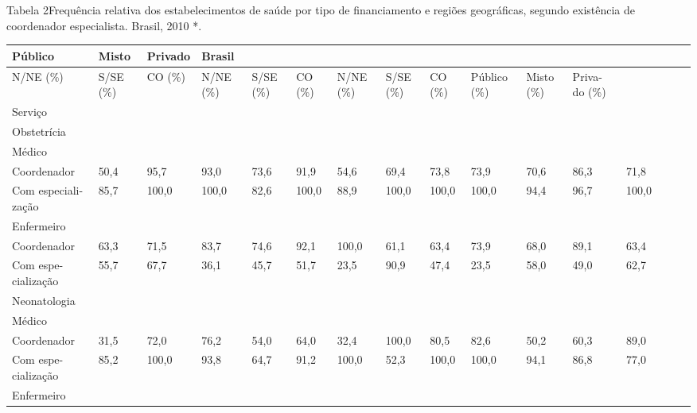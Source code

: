 \documentclass{article}
\begin{document}
Tabela 2Frequência relativa dos estabelecimentos de saúde por tipo de
financiamento e regiões geográficas, segundo existência de coordenador
especialista. Brasil, 2010 *.
\begin{table}
\begin{xtabular}{ l | l | l | l l | l | l | l | l | l | l | l | l | l | l | l }
\hline
Público & Misto & Privado & Brasil\\ \hline
N/NE (\%) & S/SE (\%) & CO (\%) & N/NE (\%) & S/SE (\%) & CO (\%) & N/NE (\%) &
S/SE (\%) & CO (\%) & Público (\%) & Misto (\%) & Priva- do (\%)\\ \hline
Serviço
&
&
&
&
&
&
&
&
&
&
&
&
\\ \hline

Obstetrícia
&
&
&
&
&
&
&
&
&
&
&
&
\\ \hline

Médico
&
&
&
&
&
&
&
&
&
&
&
&
\\ \hline

Coordenador
& 50,4
& 95,7
& 93,0
& 73,6
& 91,9
& 54,6
& 69,4
& 73,8
& 73,9
& 70,6
& 86,3
& 71,8
\\ \hline

Com especiali-zação
& 85,7
& 100,0
& 100,0
& 82,6
& 100,0
& 88,9
& 100,0
& 100,0
& 100,0
& 94,4
& 96,7
& 100,0
\\ \hline

Enfermeiro
&
&
&
&
&
&
&
&
&
&
&
&
\\ \hline

Coordenador
& 63,3
& 71,5
& 83,7
& 74,6
& 92,1
& 100,0
& 61,1
& 63,4
& 73,9
& 68,0
& 89,1
& 63,4
\\ \hline

Com espe-cialização
& 55,7
& 67,7
& 36,1
& 45,7
& 51,7
& 23,5
& 90,9
& 47,4
& 23,5
& 58,0
& 49,0
& 62,7
\\ \hline

Neonatologia
&
&
&
&
&
&
&
&
&
&
&
&
\\ \hline

Médico
&
&
&
&
&
&
&
&
&
&
&
&
\\ \hline

Coordenador
& 31,5
& 72,0
& 76,2
& 54,0
& 64,0
& 32,4
& 100,0
& 80,5
& 82,6
& 50,2
& 60,3
& 89,0
\\ \hline

Com espe-cialização
& 85,2
& 100,0
& 93,8
& 64,7
& 91,2
& 100,0
& 52,3
& 100,0
& 100,0
& 94,1
& 86,8
& 77,0
\\ \hline

Enfermeiro
&
&
&
&
&
&
&
&
&
&
&
&
\\ \hline


\end{xtabular}
\end{table}
\end{document}
